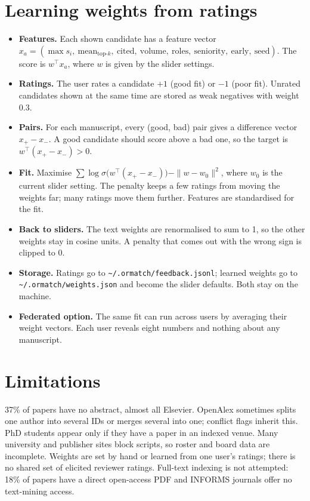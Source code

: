 \documentclass[11pt]{article}
\begin{document}
\section{Learning weights from ratings}\label{app:learn}
\begin{itemize}
\item \textbf{Features.} Each shown candidate has a feature vector $x_a = (\max s_i,\ \mathrm{mean}_{\text{top-}k},\ \text{cited},\ \text{volume},\ \text{roles},\ \text{seniority},\ \text{early},\ \text{seed})$. The score is $w^\top x_a$, where $w$ is given by the slider settings.
\item \textbf{Ratings.} The user rates a candidate $+1$ (good fit) or $-1$ (poor fit). Unrated candidates shown at the same time are stored as weak negatives with weight 0.3.
\item \textbf{Pairs.} For each manuscript, every (good, bad) pair gives a difference vector $x_+ - x_-$. A good candidate should score above a bad one, so the target is $w^\top(x_+-x_-) > 0$.
\item \textbf{Fit.} Maximise $\sum \log\sigma\bigl(w^\top(x_+-x_-)\bigr) - \|w-w_0\|^2$, where $w_0$ is the current slider setting. The penalty keeps a few ratings from moving the weights far; many ratings move them further. Features are standardised for the fit.
\item \textbf{Back to sliders.} The text weights are renormalised to sum to 1, so the other weights stay in cosine units. A penalty that comes out with the wrong sign is clipped to 0.
\item \textbf{Storage.} Ratings go to \texttt{\textasciitilde/.ormatch/feedback.jsonl}; learned weights go to \texttt{\textasciitilde/.ormatch/weights.json} and become the slider defaults. Both stay on the machine.
\item \textbf{Federated option.} The same fit can run across users by averaging their weight vectors. Each user reveals eight numbers and nothing about any manuscript.
\end{itemize}

\section{Limitations}
37\% of papers have no abstract, almost all Elsevier. OpenAlex sometimes splits one author into several IDs or merges several into one; conflict flags inherit this. PhD students appear only if they have a paper in an indexed venue. Many university and publisher sites block scripts, so roster and board data are incomplete. Weights are set by hand or learned from one user's ratings; there is no shared set of elicited reviewer ratings. Full-text indexing is not attempted: 18\% of papers have a direct open-access PDF and INFORMS journals offer no text-mining access.
\end{document}
